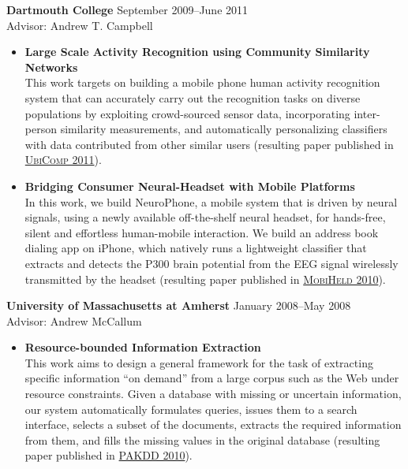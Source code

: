 {\bf Dartmouth College} \hfill September 2009--June 2011\\
Advisor: Andrew T. Campbell
\begin{itemize}
\item \textbf{Large Scale Activity Recognition using Community Similarity Networks} \\
This work targets on building a mobile phone human activity recognition system that can accurately carry out the recognition tasks on diverse populations by exploiting crowd-sourced sensor data, incorporating inter-person similarity measurements, and automatically personalizing classifiers with data contributed from other similar users (resulting paper published in \hyperlink{lane2011ubicomp}{\textsc{UbiComp 2011}}).

\item \textbf{Bridging Consumer Neural-Headset with Mobile Platforms} \\
In this work, we build NeuroPhone, a mobile system that is driven by neural signals, using a newly available off-the-shelf neural headset, for hands-free, silent and effortless human-mobile interaction. We build an address book dialing app on iPhone, which natively runs a lightweight classifier that extracts and detects the P300 brain potential from the EEG signal wirelessly transmitted by the headset (resulting paper published in \hyperlink{campbell2010mobiheld}{\textsc{MobiHeld 2010}}).
\end{itemize}

{\bf University of Massachusetts at Amherst} \hfill January 2008--May 2008 \\
Advisor: Andrew McCallum
\begin{itemize}
\item \textbf{Resource-bounded Information Extraction} \\
This work aims to design a general framework for the task of extracting specific information ``on demand'' from a large corpus such as the Web under resource constraints. Given a database with missing or uncertain information, our system automatically formulates queries, issues them to a search interface, selects a subset of the documents, extracts the required information from them, and fills the missing values in the original database (resulting paper published in \hyperlink{kanani2010pakdd}{\textsc{PAKDD 2010}}).
\end{itemize}
